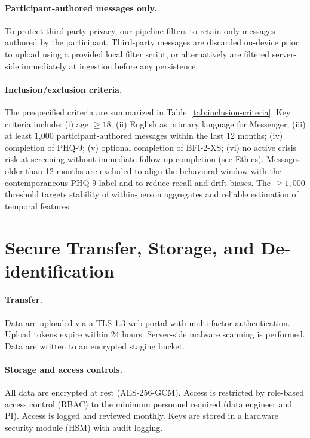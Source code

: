 \paragraph{Participant-authored messages only.} To protect third-party privacy, our pipeline filters to retain only messages authored by the participant. Third-party messages are discarded on-device prior to upload using a provided local filter script, or alternatively are filtered server-side immediately at ingestion before any persistence.

\paragraph{Inclusion/exclusion criteria.} The prespecified criteria are summarized in Table~\ref{tab:inclusion-criteria}. Key criteria include: (i) age \(\geq 18\); (ii) English as primary language for Messenger; (iii) at least 1{,}000 participant-authored messages within the last 12 months; (iv) completion of PHQ-9; (v) optional completion of BFI-2-XS; (vi) no active crisis risk at screening without immediate follow-up completion (see Ethics). Messages older than 12 months are excluded to align the behavioral window with the contemporaneous PHQ-9 label and to reduce recall and drift biases. The \(\geq 1{,}000\) threshold targets stability of within-person aggregates and reliable estimation of temporal features.



\section{Secure Transfer, Storage, and De-identification}
\label{sec:dataset-security}
\paragraph{Transfer.} Data are uploaded via a TLS 1.3 web portal with multi-factor authentication. Upload tokens expire within 24 hours. Server-side malware scanning is performed. Data are written to an encrypted staging bucket.

\paragraph{Storage and access controls.} All data are encrypted at rest (AES-256-GCM). Access is restricted by role-based access control (RBAC) to the minimum personnel required (data engineer and PI). Access is logged and reviewed monthly. Keys are stored in a hardware security module (HSM) with audit logging.

